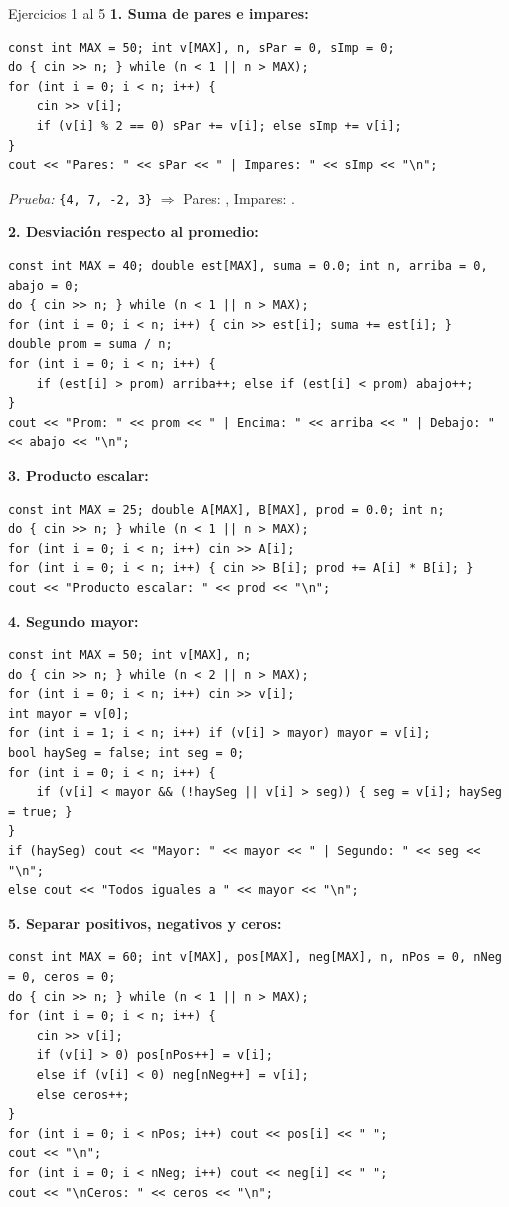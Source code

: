 \documentclass[11pt,letterpaper]{article}
\begin{document}
\begin{solucion}{Ejercicios 1 al 5}
\textbf{1. Suma de pares e impares:}
\begin{lstlisting}[style=cppmonitoria]
const int MAX = 50; int v[MAX], n, sPar = 0, sImp = 0;
do { cin >> n; } while (n < 1 || n > MAX);
for (int i = 0; i < n; i++) {
    cin >> v[i];
    if (v[i] % 2 == 0) sPar += v[i]; else sImp += v[i];
}
cout << "Pares: " << sPar << " | Impares: " << sImp << "\n";
\end{lstlisting}
\emph{Prueba:} \texttt{\{4, 7, -2, 3\}} $\Rightarrow$ Pares: , Impares: .

\textbf{2. Desviación respecto al promedio:}
\begin{lstlisting}[style=cppmonitoria]
const int MAX = 40; double est[MAX], suma = 0.0; int n, arriba = 0, abajo = 0;
do { cin >> n; } while (n < 1 || n > MAX);
for (int i = 0; i < n; i++) { cin >> est[i]; suma += est[i]; }
double prom = suma / n;
for (int i = 0; i < n; i++) {
    if (est[i] > prom) arriba++; else if (est[i] < prom) abajo++;
}
cout << "Prom: " << prom << " | Encima: " << arriba << " | Debajo: " << abajo << "\n";
\end{lstlisting}

\textbf{3. Producto escalar:}
\begin{lstlisting}[style=cppmonitoria]
const int MAX = 25; double A[MAX], B[MAX], prod = 0.0; int n;
do { cin >> n; } while (n < 1 || n > MAX);
for (int i = 0; i < n; i++) cin >> A[i];
for (int i = 0; i < n; i++) { cin >> B[i]; prod += A[i] * B[i]; }
cout << "Producto escalar: " << prod << "\n";
\end{lstlisting}

\textbf{4. Segundo mayor:}
\begin{lstlisting}[style=cppmonitoria]
const int MAX = 50; int v[MAX], n;
do { cin >> n; } while (n < 2 || n > MAX);
for (int i = 0; i < n; i++) cin >> v[i];
int mayor = v[0];
for (int i = 1; i < n; i++) if (v[i] > mayor) mayor = v[i];
bool haySeg = false; int seg = 0;
for (int i = 0; i < n; i++) {
    if (v[i] < mayor && (!haySeg || v[i] > seg)) { seg = v[i]; haySeg = true; }
}
if (haySeg) cout << "Mayor: " << mayor << " | Segundo: " << seg << "\n";
else cout << "Todos iguales a " << mayor << "\n";
\end{lstlisting}

\textbf{5. Separar positivos, negativos y ceros:}
\begin{lstlisting}[style=cppmonitoria]
const int MAX = 60; int v[MAX], pos[MAX], neg[MAX], n, nPos = 0, nNeg = 0, ceros = 0;
do { cin >> n; } while (n < 1 || n > MAX);
for (int i = 0; i < n; i++) {
    cin >> v[i];
    if (v[i] > 0) pos[nPos++] = v[i];
    else if (v[i] < 0) neg[nNeg++] = v[i];
    else ceros++;
}
for (int i = 0; i < nPos; i++) cout << pos[i] << " ";
cout << "\n";
for (int i = 0; i < nNeg; i++) cout << neg[i] << " ";
cout << "\nCeros: " << ceros << "\n";
\end{lstlisting}
\end{solucion}
\end{document}
